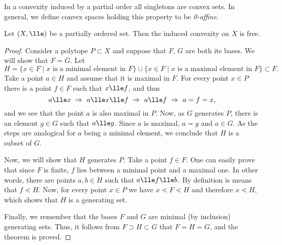 \documentclass[12pt, a4paper]{article}
\newcommand{\btw}{\lessdot}
\begin{document}
\begin{observation}\label{ord-singl-obs}
    In a convexity induced by a partial order all singletons are convex sets. In general, we define convex spaces holding this property to be \textit{0-affine}.
\end{observation}


\begin{theorem}\label{th-ord-free}
    Let \((X, \lle)\) be a partially ordered set. Then the induced convexity on \(X\) is free.
\end{theorem}
\begin{proof}
    Consider a polytope \(P \subset X\) and suppose that \(F\), \(G\) are both its bases. We will show that \(F = G\). Let \[H = \{x \in F \mid x \mbox{ is a minimal element in } F\} \cup \{x \in F \mid x \mbox{ is a maximal element in } F\} \subset F.\] Take a point \(a \in H\) and assume that it is maximal in \(F\). For every point \(x \in P\) there is a point \(f \in F\) such that \(x \lle f\), and thus \[a \lle x \ \Rightarrow \ a \lle x \lle f \ \Rightarrow \ a \lle f \ \Rightarrow \ a = f = x,\]  and we see that the point \(a\) is also maximal in \(P\). Now, as \(G\) generates \(P\), there is an element \(g \in G\) such that \(a \lle g\). Since \(a\) is maximal, \(a = g\) and \(a \in G\). As the steps are analogical for \(a\) being a minimal element, we conclude that \(H\) is a subset of \(G\).

    Now, we will show that \(H\) generates \(P\). Take a point \(f \in F\). One can easily prove that since \(F\) is finite, \(f\) lies between a minimal point and a maximal one. In other words, there are points \(a, b \in H\) such that \(a \lle f \lle b\). By definition is means that \(f \btw H\). Now, for every point \(x \in P\) we have \(x \btw F \btw H\) and therefore \(x \btw H\), which shows that \(H\) is a generating set.

    Finally, we remember that the bases \(F\) and \(G\) are minimal (by inclusion) generating sets. Thus, it follows from \(F \supset H \subset G\) that \(F = H = G\), and the theorem is proved.
\end{proof}
\end{document}

